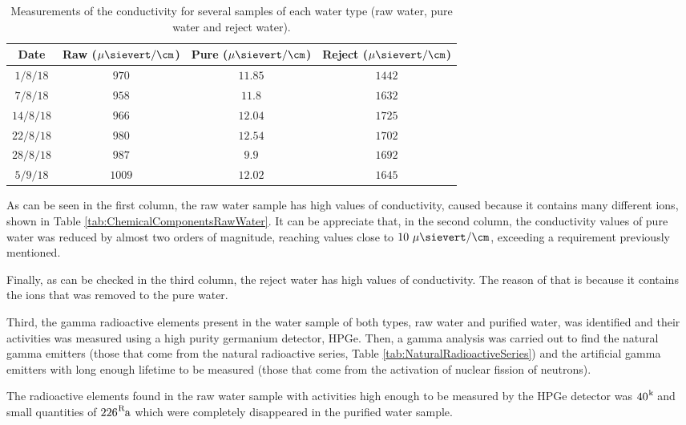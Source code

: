 \begin{table}[htbp]
\begin{center}
\begin{tabular}{|c|c|c|c|}
\hline
Date & Raw ($\mu\sievert/\cm$) & Pure ($\mu\sievert/\cm$) & Reject ($\mu\sievert/\cm$) \\
\hline \hline \hline
$1/8/18$ & $970$ & $11.85$ & $1442$ \\ \hline
$7/8/18$ & $958$ & $11.8$ & $1632$ \\ \hline
$14/8/18$ & $966$ & $12.04$ & $1725$ \\ \hline
$22/8/18$ & $980$ & $12.54$ & $1702$ \\ \hline
$28/8/18$ & $987$ & $9.9$ & $1692$ \\ \hline
$5/9/18$ & $1009$ & $12.02$ & $1645$ \\ \hline
\end{tabular}
\caption{Measurements of the conductivity for several samples of each water type (raw water, pure water and reject water).}
\label{tab:ConductivityValues}
\end{center}
\end{table}	

As can be seen in the first column, the raw water sample has high values of conductivity, caused because it contains many different ions, shown in Table \ref{tab:ChemicalComponentsRawWater}. It can be appreciate that, in the second column, the conductivity values of pure water was reduced by almost two orders of magnitude, reaching values close to $10~\mu\sievert/\cm$, exceeding a requirement previously mentioned.

Finally, as can be checked in the third column, the reject water has high values of conductivity. The reason of that is because it contains the ions that was removed to the pure water.

Third, the gamma radioactive elements present in the water sample of both types, raw water and purified water, was identified and their activities was measured using a high purity germanium detector, HPGe. Then, a gamma analysis was carried out to find the natural gamma emitters (those that come from the natural radioactive series, Table \ref{tab:NaturalRadioactiveSeries}) and the artificial gamma emitters with long enough lifetime to be measured (those that come from the activation of nuclear fission of neutrons). 

The radioactive elements found in the raw water sample with activities high enough to be measured by the HPGe detector was $\ce{{40}^k}$ and small quantities of $\ce{{226}^Ra}$ which were completely disappeared in the purified water sample.

